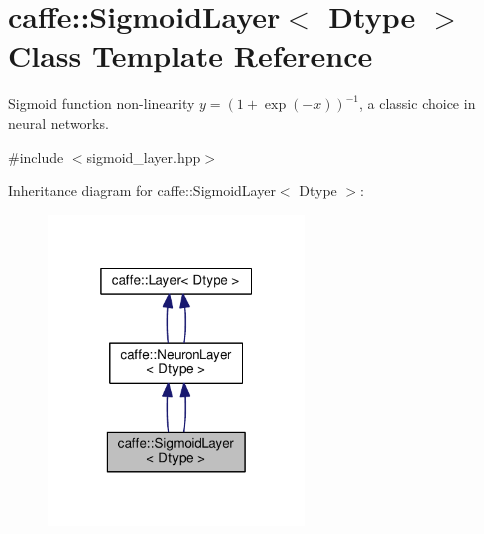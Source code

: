 \hypertarget{classcaffe_1_1_sigmoid_layer}{}\section{caffe\+:\+:Sigmoid\+Layer$<$ Dtype $>$ Class Template Reference}
\label{classcaffe_1_1_sigmoid_layer}


Sigmoid function non-\/linearity $ y = (1 + \exp(-x))^{-1} $, a classic choice in neural networks.  




{\ttfamily \#include $<$sigmoid\+\_\+layer.\+hpp$>$}



Inheritance diagram for caffe\+:\+:Sigmoid\+Layer$<$ Dtype $>$\+:
\nopagebreak
\begin{figure}[H]
\begin{center}
\leavevmode
\includegraphics[width=193pt]{classcaffe_1_1_sigmoid_layer__inherit__graph}
\end{center}
\end{figure}
